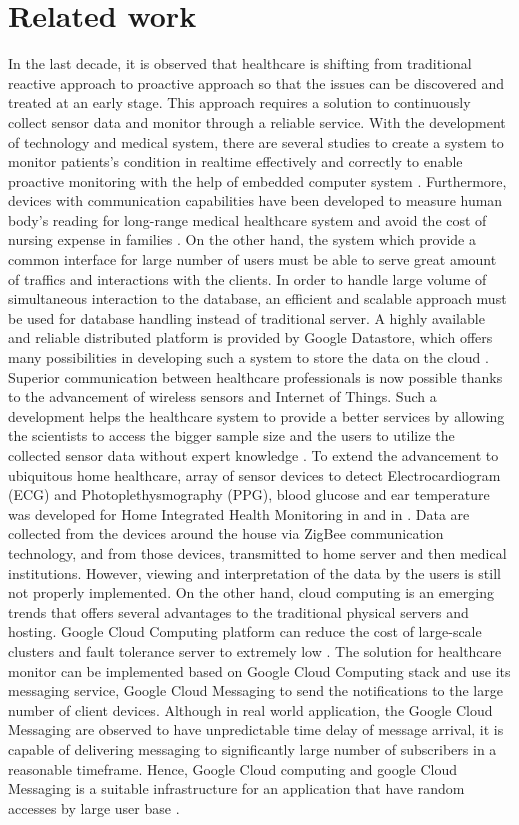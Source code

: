 \section{Related work}
In the last decade, it is observed that healthcare is shifting from traditional reactive approach to proactive approach so
that the issues can be discovered and treated at an early stage. This approach requires a solution to continuously
collect sensor data and monitor through a reliable service.  With the development of technology and medical system,
there are several studies to create a system to monitor patients's condition in realtime effectively and correctly to
enable proactive monitoring \cite{5076774} with the help of embedded computer system \cite{4062461}. Furthermore,
devices with communication capabilities have been developed to measure human body's reading for long-range medical
healthcare system and avoid the cost of nursing expense in families \cite{5918041}. On the other hand, the system which
provide a common interface for large number of users must be able to serve great amount of traffics and interactions
with the clients.  In order to handle large volume of simultaneous interaction to the database, an efficient and
scalable approach must be used for database handling instead of traditional server. A highly available and reliable
distributed platform is provided by Google Datastore, which offers many possibilities in developing such a system to
store the data on the cloud \cite{7059154}.  Superior communication between healthcare professionals is now possible
thanks to the advancement of wireless sensors and Internet of Things. Such a development helps the healthcare system to
provide a better services by allowing the scientists to access the bigger sample size and the users to utilize the
collected sensor data without expert knowledge \cite{7027488}.  To extend the advancement to ubiquitous home
healthcare, array of sensor devices to detect Electrocardiogram (ECG) and Photoplethysmography (PPG), blood glucose
and ear temperature was developed for Home Integrated Health Monitoring in \cite{4352299} and in \cite{5918041}. Data
are collected from the devices around the house via ZigBee communication technology, and from those devices, transmitted
to home server and then medical institutions. However, viewing and interpretation of the data by the users is still not
properly implemented.  On the other hand, cloud computing is an emerging trends that offers several advantages to the
traditional physical servers and hosting. Google Cloud Computing platform can reduce the cost of large-scale clusters
and fault tolerance server to extremely low \cite{5718338}. The solution for healthcare monitor can be implemented
based on Google Cloud Computing stack and use its messaging service, Google Cloud Messaging to send the notifications to
the large number of client devices. Although in real world application, the Google Cloud Messaging are observed to have
unpredictable time delay of message arrival, it is capable of delivering messaging to significantly large number of
subscribers in a reasonable timeframe. Hence, Google Cloud computing and google Cloud Messaging is a suitable
infrastructure for an application that have random accesses by large user base \cite{7037233}.

